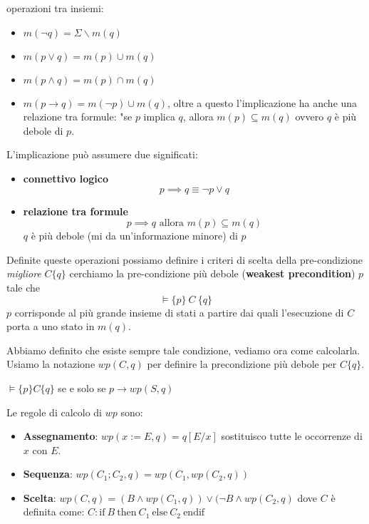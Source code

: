 operazioni tra insiemi:
\begin{itemize}
    \item $m(\lnot q) = \Sigma \backslash m(q)$
    \item $m(p \lor q) = m(p) \cup m(q)$
    \item $m(p \land q) = m(p) \cap m(q)$
    \item $m(p \to q) = m(\lnot p) \cup m(q)$, oltre a questo l'implicazione ha
          anche una relazione tra formule: "se $p$ implica $q$, allora $m(p) \subseteq m(q)$
          ovvero $q$ è più debole di $p$.
\end{itemize}
\begin{nota}
    L'implicazione può assumere due significati:
	\begin{itemize}
		\item \textbf{connettivo logico}
		$$p\implies q \equiv\lnot p\lor q$$
		\item \textbf{relazione tra formule}
		$$p\implies q \text{ allora } m(p)\subseteq m(q)$$
		$q$ è più debole (mi da un'informazione minore) di $p$ 
	\end{itemize}
\end{nota}
Definite queste operazioni possiamo definire i criteri di scelta della pre-condizione
\textit{migliore} $C \{q\}$ cerchiamo la pre-condizione più debole
(\textbf{weakest precondition}) $p$ tale che $$\models \{p\} \ C \ \{q\}$$ $p$
corrisponde al più grande insieme di stati a partire dai quali l'esecuzione di
$C$ porta a uno stato in $m(q)$.

Abbiamo definito che esiste sempre tale condizione, vediamo ora come calcolarla.
Usiamo la notazione $wp(C, q)$ per definire la precondizione più debole per $C \{q\}$.
\begin{teorema}
    $\models \{p\} C \{q\}$ se e solo se $p \to wp(S, q)$
\end{teorema}
Le regole di calcolo di $wp$ sono:
\begin{itemize}
    \item \textbf{Assegnamento}: $wp(x := E, q) = q[E / x]$ sostituisco tutte le
          occorrenze di $x$ con $E$.
    \item \textbf{Sequenza}: $wp(C_1;C_2, q) = wp(C_1, wp(C_2, q))$
    \item \textbf{Scelta}: $wp(C, q) = (B \land wp(C_1, q)) \lor (\lnot B \land wp(C_2, q)$
          dove $C$ è definita come: $C: \text{if} \ B \ \text{then} \ C_1 \ \text{else} \ C_2 \ \text{endif}$
\end{itemize}